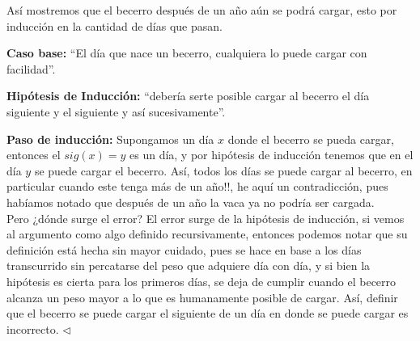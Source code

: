 \documentclass{article}
\begin{document}
Así mostremos que el becerro después de un año aún se podrá cargar, esto por inducción en la
cantidad de días que pasan.

\textbf{Caso base:} ``El día que nace un becerro, cualquiera lo puede cargar con facilidad''.

\textbf{Hipótesis de Inducción:} ``debería serte posible cargar al becerro el día siguiente
y el siguiente y así sucesivamente''.

\textbf{Paso de inducción:} Supongamos un día $x$ donde el becerro se pueda cargar, entonces
el $sig(x) = y$ es un día, y por hipótesis de inducción tenemos que en el día $y$ se puede
cargar el becerro. Así, todos los días se puede cargar al becerro, en particular cuando este
tenga más de un año!!, he aquí un contradicción, pues habíamos notado que después de un año
la vaca ya no podría ser cargada.
\\

Pero ¿dónde surge el error? El error surge de la hipótesis de inducción, si vemos al argumento
como algo definido recursivamente, entonces podemos notar que su definición está hecha sin mayor
cuidado, pues se hace en base a los días transcurrido sin percatarse del peso que adquiere día
con día, y si bien la hipótesis es cierta para los primeros días, se deja de cumplir cuando
el becerro alcanza un peso mayor a lo que es humanamente posible de cargar. Así, definir que el
becerro se puede cargar el siguiente de un día en donde se puede cargar es incorrecto.
\hfill $\lhd$
\end{document}
